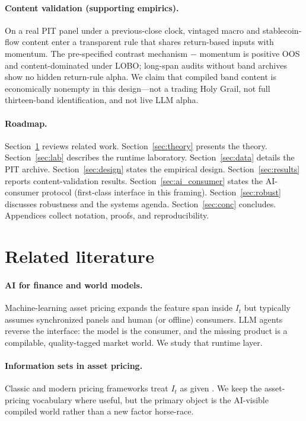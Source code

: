 \documentclass[12pt]{article}
\begin{document}
\paragraph{Content validation (supporting empirics).}
On a real PIT panel under a previous-close clock, vintaged macro and stablecoin-flow content enter a transparent rule that shares return-based inputs with momentum. The pre-specified contrast mechanism $-$ momentum is positive OOS and content-dominated under LOBO; long-span audits without band archives show no hidden return-rule alpha. We claim that compiled band content is economically nonempty in this design---not a trading Holy Grail, not full thirteen-band identification, and not live LLM alpha.

\paragraph{Roadmap.}
Section~\ref{sec:lit} reviews related work. Section~\ref{sec:theory} presents the theory. Section~\ref{sec:lab} describes the runtime laboratory. Section~\ref{sec:data} details the PIT archive. Section~\ref{sec:design} states the empirical design. Section~\ref{sec:results} reports content-validation results. Section~\ref{sec:ai_consumer} states the AI-consumer protocol (first-class interface in this framing). Section~\ref{sec:robust} discusses robustness and the systems agenda. Section~\ref{sec:conc} concludes. Appendices collect notation, proofs, and reproducibility.

\section{Related literature}
\label{sec:lit}

\paragraph{AI for finance and world models.}
Machine-learning asset pricing expands the feature span inside $I_t$ \citep{gu2020,kelly2019,nagel2021} but typically assumes synchronized panels and human (or offline) consumers. LLM agents reverse the interface: the model is the consumer, and the missing product is a compilable, quality-tagged market world. We study that runtime layer.

\paragraph{Information sets in asset pricing.}
Classic and modern pricing frameworks treat $I_t$ as given \citep{cochrane2005,fama1993}. We keep the asset-pricing vocabulary where useful, but the primary object is the AI-visible compiled world rather than a new factor horse-race.
\end{document}
